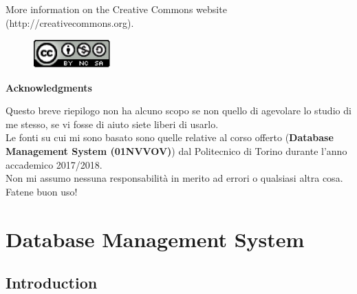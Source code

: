 \documentclass[12pt]{article}
\begin{document}
\noindent More information on the Creative Commons website (http://creativecommons.org).

\begin{figure}[h!]
  \centering
  \includegraphics[width=3cm]{images/license.png}
\end{figure}

{\noindent \Large \textbf{Acknowledgments}\bigskip}

Questo breve riepilogo non ha alcuno scopo se non quello di agevolare lo studio di me stesso, se vi fosse di aiuto siete liberi di usarlo.\\
Le fonti su cui mi sono basato sono quelle relative al corso offerto (\textbf{Database Management System (01NVVOV)}) dal Politecnico di Torino durante l'anno accademico 2017/2018.\\
Non mi assumo nessuna responsabilità in merito ad errori o qualsiasi altra cosa. Fatene buon uso!
\clearpage

\section{Database Management System}
\subsection{Introduction}
\end{document}
